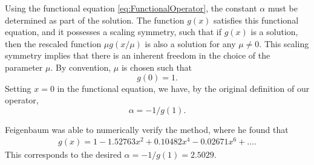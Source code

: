 Using the functional equation \eqref{eq:FunctionalOperator}, the constant $\alpha$ must be determined as part of the solution. 
The function $g(x)$ satisfies this functional equation, and it possesses a scaling symmetry, such that if $g(x)$ is a solution, then the rescaled function $\mu g(x/\mu)$ is also a solution for any $\mu \neq 0$. 
This scaling symmetry implies that there is an inherent freedom in the choice of the parameter $\mu$.
By convention, $\mu$ is chosen such that 
$$
g(0)=1.
$$
Setting $x=0$ in the functional equation, we have, by the original definition  of our operator,
\begin{equation}\label{eq:alpha}
\alpha = -1/g(1).
\end{equation}

Feigenbaum was able to numerically verify the method, where he found that
\begin{align}
    g(x)= 1 - 1.52763x^2 + 0.10482x^4- 0.02671x^6 + \dots .\label{eq:feigenbaum}
\end{align}
This corresponds to the desired $\alpha =-1/g(1)=2.5029$.

